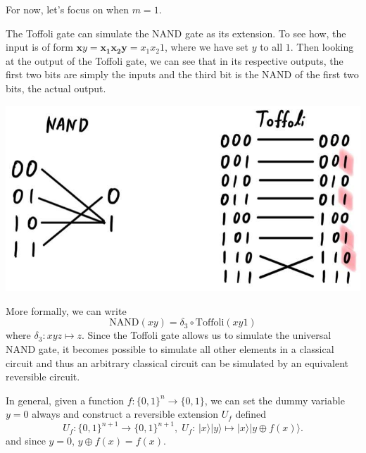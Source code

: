 \documentclass{article}
\begin{document}
      For now, let's focus on when $m = 1$. 

      \begin{example}
        The Toffoli gate can simulate the NAND gate as its extension. To see how, the input is of form $\mathbf{x} y = \mathbf{x_1 x_2 y} = x_1 x_2 1$, where we have set $y$ to all $1$. Then looking at the output of the Toffoli gate, we can see that in its respective outputs, the first two bits are simply the inputs and the third bit is the NAND of the first two bits, the actual output. 

        \begin{center}
          \includegraphics[scale=0.3]{img/Toffoli_NAND_extension.jpg}
        \end{center}
        More formally, we can write 
        \begin{equation} 
          \text{NAND}(xy) = \delta_3 \circ \text{Toffoli}(xy1)
        \end{equation}
        where $\delta_3: xyz \mapsto z$. Since the Toffoli gate allows us to simulate the universal NAND gate, it becomes possible to simulate all other elements in a classical circuit and thus an arbitrary classical circuit can be simulated by an equivalent reversible circuit.
      \end{example}

      \begin{definition}
        In general, given a function $f: \{0, 1\}^n \rightarrow \{0, 1\}$, we can set the dummy variable $y = 0$ always and construct a reversible extension $U_f$ defined 
        \begin{equation} 
          U_f: \{0, 1\}^{n+1} \longrightarrow \{0, 1\}^{n+1}, \; U_f: \, |x \rangle |y\rangle \mapsto |x\rangle |y \oplus f(x) \rangle.
        \end{equation} 
        and since $y = 0$, $y \oplus f(x) = f(x)$.
      \end{definition}
\end{document}

